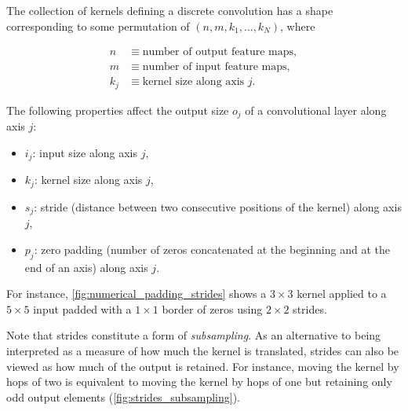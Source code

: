 \documentclass[notitlepage]{report}
\begin{document}
The collection of kernels defining a discrete convolution has a shape
corresponding to some permutation of $(n, m, k_1, \ldots, k_N)$, where

\begin{equation*}
\begin{split}
    n &\equiv \text{number of output feature maps},\\
    m &\equiv \text{number of input feature maps},\\
    k_j &\equiv \text{kernel size along axis $j$}.
\end{split}
\end{equation*}

The following properties affect the output size $o_j$ of a convolutional layer
along axis $j$:

\begin{itemize}
    \item $i_j$: input size along axis $j$,
    \item $k_j$: kernel size along axis $j$,
    \item $s_j$: stride (distance between two consecutive positions of the
        kernel) along axis $j$,
    \item $p_j$: zero padding (number of zeros concatenated at the beginning and
        at the end of an axis) along axis $j$.
\end{itemize}

\noindent For instance, \autoref{fig:numerical_padding_strides} shows a $3
\times 3$ kernel applied to a $5 \times 5$ input padded with a $1 \times 1$
border of zeros using $2 \times 2$ strides.

Note that strides constitute a form of \emph{subsampling}. As an alternative to
being interpreted as a measure of how much the kernel is translated, strides
can also be viewed as how much of the output is retained. For instance, moving
the kernel by hops of two is equivalent to moving the kernel by hops of one but
retaining only odd output elements (\autoref{fig:strides_subsampling}).
\end{document}
